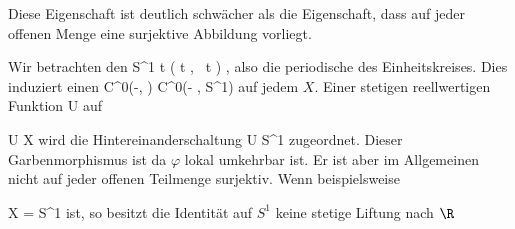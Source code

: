 Diese Eigenschaft ist deutlich schwächer als die Eigenschaft, dass auf jeder offenen Menge eine surjektive Abbildung vorliegt.

{





Wir betrachten den
\maabbeledisp {\varphi} {\R} {S^1
} { t } { \left(  \cos  t   , \,   \sin  t                   \right)
} {,}
also die periodische
des Einheitskreises. Dies induziert einen
\maabbdisp {} { C^0(-, \R)} { C^0(- , S^1)
} {}
auf jedem
$X$. Einer stetigen reellwertigen Funktion
 { U } { \R
} {}
auf

\mavergleichskette
{\vergleichskette
{U
}
{ \subseteq }{ X
}
{  }{
}
{    }{
}
{   }{
}
}
{}{}{}
wird die Hintereinanderschaltung
 { U } { S^1
} {}
zugeordnet. Dieser Garbenmorphismus ist
da $\varphi$ lokal umkehrbar ist. Er ist aber im Allgemeinen nicht auf jeder offenen Teilmenge surjektiv. Wenn beispielsweise

\mavergleichskette
{\vergleichskette
{X
}
{ = }{S^1
}
{  }{
}
{    }{
}
{   }{
}
}
{}{}{}
ist, so besitzt die Identität auf $S^1$ keine stetige Liftung nach $\R$





}





